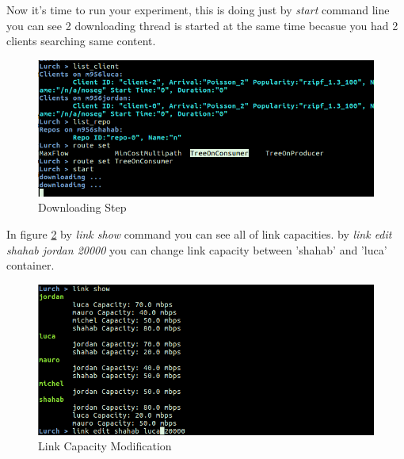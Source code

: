 Now it's time to run your experiment, this is doing just by \textit{start} command line you can see 2 downloading thread is started at the same time becasue you had 2 clients searching same content.  

\begin{figure}[H]

\begin{center}

\includegraphics[scale = 0.35]{Pictures/download.png}

\caption{Downloading Step} \label{download} 

\end{center}

\end{figure}


In figure \ref{capacity} by \textit{link show} command you can see all of link capacities. by \textit{link edit shahab jordan 20000} you can change link capacity between 'shahab' and 'luca' container.

\begin{figure}[H]

\begin{center}

\includegraphics[scale = 0.35]{Pictures/capacity.png}

\caption{Link Capacity Modification} \label{capacity} 

\end{center}

\end{figure}
 

